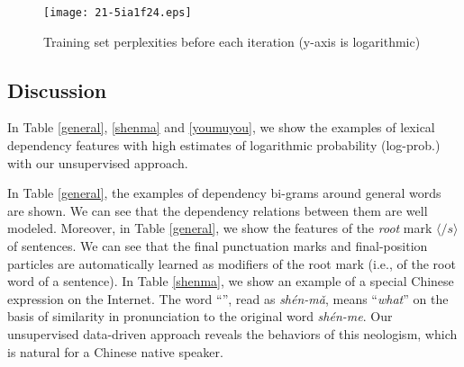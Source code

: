 \documentclass[english]{jnlp_1.4}
\begin{document}
\begin{figure}[t]
\begin{center}
\texttt{[image: 21-5ia1f24.eps]}
\end{center}
\caption{Training set perplexities before each iteration (y-axis is logarithmic)}
\label{conv}
\end{figure}


\subsection{Discussion}

In Table \ref{general}, \ref{shenma} and \ref{youmuyou}, we show the examples of lexical dependency features with high estimates of logarithmic probability (log-prob.) with our unsupervised approach.

In Table \ref{general}, the examples of dependency bi-grams around general words are shown. We can see that the dependency relations between them are well modeled. Moreover, in Table \ref{general}, we show the features of the {\em root} mark $\langle \slash s \rangle$ of sentences. We can see that the final punctuation marks and final-position particles are automatically learned as modifiers of the root mark (i.e., of the root word of a sentence).
In Table \ref{shenma}, we show an example of a special Chinese expression on the Internet. 
    The word ``'', 
read as {\em sh\'{e}n-m\v{a}}, means ``{\em what}'' on the basis of similarity in pronunciation to the original word {\em sh\'{e}n-me}. Our unsupervised data-driven approach reveals the behaviors of this neologism, which is natural for a Chinese native speaker.
\end{document}
